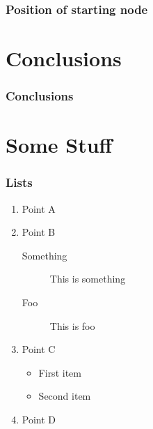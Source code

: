\documentclass[aspectratio=169]{beamer}
\begin{document}
\begin{frame}
	\frametitle{Position of starting node}
\end{frame}

\section{Conclusions}
\begin{frame}
	\frametitle{Conclusions}
\end{frame}

\section{Some Stuff}

\begin{frame}
	\frametitle{Lists}
	\begin{enumerate}
		\item Point A
		\item Point B
		\begin{description}
			\item[Something] This is something
			\item[Foo] This is foo
		\end{description}
		\item Point C
		\begin{itemize}
			\item First item
			\item Second item
		\end{itemize}
		\item Point D
	\end{enumerate}
\end{frame}
\end{document}
